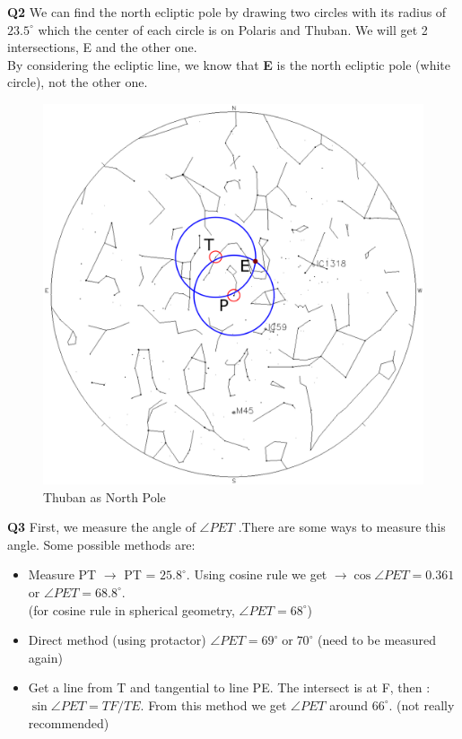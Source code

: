 \documentclass[a4paper,12pt]{extarticle}
\begin{document}
\begin{sol}
\textbf{Q2} We can find the north ecliptic pole by drawing two circles with its radius of $23.5^\circ$ which the center of each circle is on Polaris and Thuban. We will get 2 intersections, E and the other one.\\
By considering the ecliptic line, we know that \textbf{E} is the north ecliptic pole (white circle), not the other one.

\begin{figure}[H]
	\centering
	\includegraphics[width=0.8\linewidth]{thuban.png}
	\caption{Thuban as North Pole}
	\label{precession}
\end{figure}

\textbf{Q3} First, we measure the angle of $\angle PET$ .There are some ways to measure this angle. Some possible methods are:
\begin{itemize}
	\item Measure PT $\rightarrow$ PT = $25.8^\circ$.
	Using cosine rule we get $\rightarrow \cos\angle PET =0.361$ or $\angle PET= 68.8^\circ$.\\
	(for cosine rule in spherical geometry, $\angle PET= 68^\circ$)
	\item Direct method (using protactor) $\angle PET= 69^\circ\; \text{or} \; 70^\circ$ (need to be measured again)
	\item Get a line from T and tangential to line PE. The intersect is at F, then : $\sin\angle PET = TF/TE$. From this method we get $\angle PET$ around $66^\circ$. (not really recommended)
\end{itemize}


\end{sol}
\end{document}
